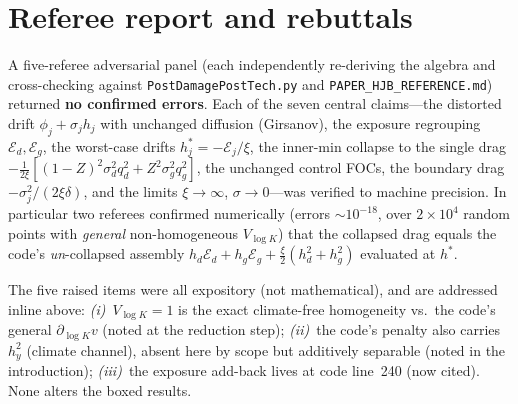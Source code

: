 \documentclass[11pt]{article}
\newcommand{\xicap}{\xi}
\begin{document}
\section*{Referee report and rebuttals}

A five-referee adversarial panel (each independently re-deriving the algebra and
cross-checking against \texttt{PostDamagePostTech.py} and \texttt{PAPER\_HJB\_REFERENCE.md})
returned \textbf{no confirmed errors}. Each of the seven central claims---the distorted
drift $\phi_j+\sigma_j h_j$ with unchanged diffusion (Girsanov), the exposure regrouping
$\mathcal E_d,\mathcal E_g$, the worst-case drifts $h_j^\ast=-\mathcal E_j/\xicap$, the
inner-min collapse to the single drag $-\tfrac1{2\xicap}[(1-Z)^2\sigma_d^2q_d^2+Z^2\sigma_g^2q_g^2]$,
the unchanged control FOCs, the boundary drag $-\sigma_j^2/(2\xicap\delta)$, and the limits
$\xicap\to\infty$, $\sigma\to0$---was verified to machine precision. In particular two
referees confirmed numerically (errors $\sim10^{-18}$, over $2\!\times\!10^4$ random points
with \emph{general} non-homogeneous $V_{\log K}$) that the collapsed drag equals the code's
\emph{un}-collapsed assembly $h_d\mathcal E_d+h_g\mathcal E_g+\tfrac{\xicap}{2}(h_d^2+h_g^2)$
evaluated at $h^\ast$.

The five raised items were all expository (not mathematical), and are addressed inline
above: \emph{(i)}~$V_{\log K}=1$ is the exact climate-free homogeneity vs.\ the code's
general $\partial_{\log K}v$ (noted at the reduction step); \emph{(ii)}~the code's penalty
also carries $h_y^2$ (climate channel), absent here by scope but additively separable
(noted in the introduction); \emph{(iii)}~the exposure add-back lives at code line~240
(now cited). None alters the boxed results.
\end{document}
